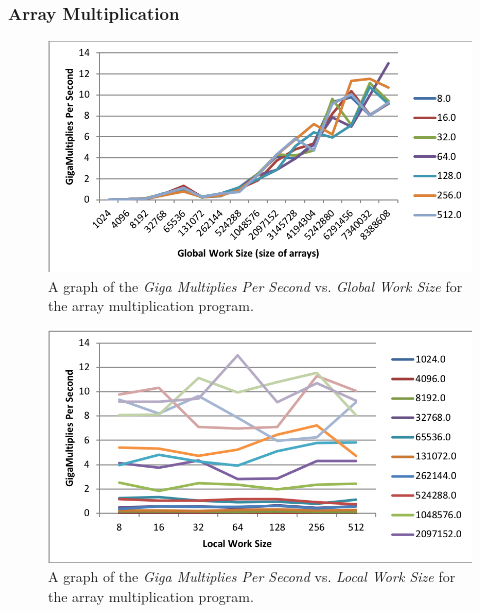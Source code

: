 \documentclass[onecolumn,draftclsnofoot, 10pt, compsoc]{IEEEtran}
\begin{document}
		\subsubsection{Array Multiplication}
			\begin{figure}[H]
				\includegraphics[width=16cm]{multGlobal}
				\centering
				\caption{A graph of the \textit{Giga Multiplies Per Second} vs. \textit{Global Work Size} for the array multiplication program.}
			\end{figure}
				
			\begin{figure}[H]
				\includegraphics[width=16cm]{multLocal}
				\centering
				\caption{A graph of the \textit{Giga Multiplies Per Second} vs. \textit{Local Work Size} for the array multiplication program.}
			\end{figure}
				
				
\end{document}
